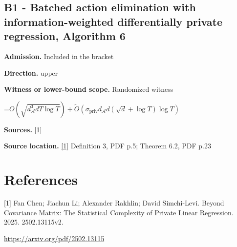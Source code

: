 \documentclass[10pt,a4paper]{article}
\newcommand{\AtlasMath}[1]{\par\begingroup\centering\setbox0=\hbox{$\displaystyle #1$}\ifdim\wd0>1.4\linewidth\typeout{ATLAS WIDE FORMULA: \the\wd0}\fi\ifdim\wd0>\linewidth\resizebox{\linewidth}{!}{\box0}\else\box0\fi\par\endgroup}
\begin{document}
\subsection{B1 - Batched action elimination with information-weighted differentially private regression, Algorithm 6}
\textbf{Admission.} Included in the bracket

\textbf{Direction.} upper

\textbf{Witness or lower-bound scope.} Randomized witness

\AtlasMath{O\!\left(\sqrt{d_{\mathcal{A}}^{3}dT\log T}\right)+\widetilde{O}\!\left(\sigma_{\mathrm{priv}}d_{\mathcal{A}}d(\sqrt d+\log T)\log T\right)}
\textbf{Sources.} \href{https://arxiv.org/pdf/2502.13115}{[1]}

\textbf{Source location.} \href{https://arxiv.org/pdf/2502.13115}{[1]} Definition 3, PDF p.5; Theorem 6.2, PDF p.23

\section{References}
[1] Fan Chen; Jiachun Li; Alexander Rakhlin; David Simchi-Levi. Beyond Covariance Matrix: The Statistical Complexity of Private Linear Regression. 2025. 2502.13115v2.

\url{https://arxiv.org/pdf/2502.13115}
\end{document}
